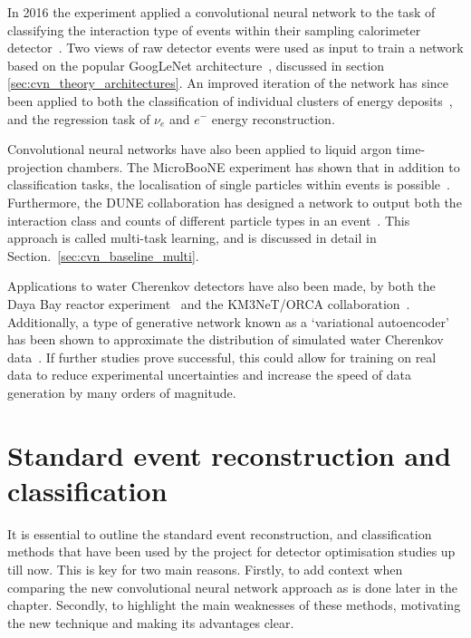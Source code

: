 In 2016 the \nova experiment applied a convolutional neural network to the task of classifying the
interaction type of events within their sampling calorimeter detector~\cite{aurisano2016}. Two
views of raw detector events were used as input to train a network based on the popular GoogLeNet
architecture~\cite{szegedy2015}, discussed in section \ref{sec:cvn_theory_architectures}. An
improved iteration of the network has since been applied to both the classification of individual
clusters of energy deposits~\cite{aurisano2016}, and the regression task of $\nu_{e}$ and $e^{-}$
energy reconstruction.

Convolutional neural networks have also been applied to liquid argon time-projection chambers. The
MicroBooNE experiment has shown that in addition to classification tasks, the localisation of
single particles within events is possible~\cite{acciarri2017}. Furthermore, the DUNE
collaboration has designed a network to output both the interaction class and counts of different
particle types in an event~\cite{collaboration2020, abi2020}. This approach is called multi-task
learning, and is discussed in detail in Section.~\ref{sec:cvn_baseline_multi}.

Applications to water Cherenkov detectors have also been made, by both the Daya Bay reactor
experiment~\cite{racah2016} and the KM3NeT/ORCA collaboration~\cite{aiello2020}. Additionally, a
type of generative network known as a `variational autoencoder' has been shown to approximate the
distribution of simulated water Cherenkov data~\cite{abhishek2019}. If further studies prove
successful, this could allow for training on real data to reduce experimental uncertainties and
increase the speed of data generation by many orders of magnitude.

\section{Standard event reconstruction and classification} %
\label{sec:cvn_old} %

It is essential to outline the standard event reconstruction, and classification methods that have
been used by the \chips project for detector optimisation studies up till now. This is key for two
main reasons. Firstly, to add context when comparing the new convolutional neural network approach
as is done later in the chapter. Secondly, to highlight the main weaknesses of these methods,
motivating the new technique and making its advantages clear.

